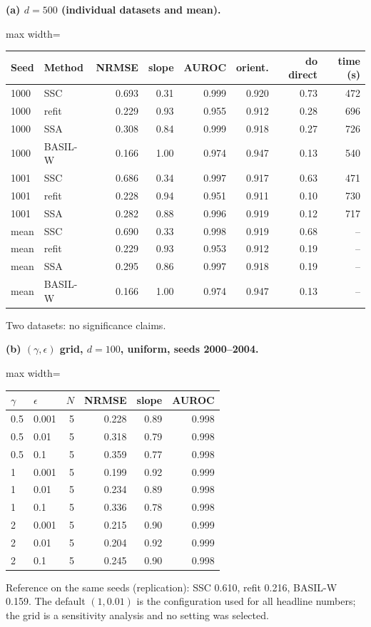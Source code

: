 \textbf{(a) $d=500$ (individual datasets and mean).}

\begin{adjustbox}{max width=\textwidth}
\begin{tabular}{llrrrrrr}
\toprule
Seed & Method & NRMSE & slope & AUROC & orient. & do direct & time (s) \\
\midrule
1000 & SSC & 0.693 & 0.31 & 0.999 & 0.920 & 0.73 & 472 \\
1000 & refit & 0.229 & 0.93 & 0.955 & 0.912 & 0.28 & 696 \\
1000 & SSA & 0.308 & 0.84 & 0.999 & 0.918 & 0.27 & 726 \\
1000 & BASIL-W & 0.166 & 1.00 & 0.974 & 0.947 & 0.13 & 540 \\
1001 & SSC & 0.686 & 0.34 & 0.997 & 0.917 & 0.63 & 471 \\
1001 & refit & 0.228 & 0.94 & 0.951 & 0.911 & 0.10 & 730 \\
1001 & SSA & 0.282 & 0.88 & 0.996 & 0.919 & 0.12 & 717 \\
mean & SSC & 0.690 & 0.33 & 0.998 & 0.919 & 0.68 & -- \\
mean & refit & 0.229 & 0.93 & 0.953 & 0.912 & 0.19 & -- \\
mean & SSA & 0.295 & 0.86 & 0.997 & 0.918 & 0.19 & -- \\
mean & BASIL-W & 0.166 & 1.00 & 0.974 & 0.947 & 0.13 & -- \\
\bottomrule
\end{tabular}
\end{adjustbox}

\smallskip
{\footnotesize Two datasets: no significance claims.}

\bigskip
\textbf{(b) $(\gamma,\epsilon)$ grid, $d=100$, uniform, seeds 2000--2004.}

\begin{adjustbox}{max width=\textwidth}
\begin{tabular}{llrrrr}
\toprule
$\gamma$ & $\epsilon$ & $N$ & NRMSE & slope & AUROC \\
\midrule
0.5 & 0.001 & 5 & 0.228 & 0.89 & 0.998 \\
0.5 & 0.01 & 5 & 0.318 & 0.79 & 0.998 \\
0.5 & 0.1 & 5 & 0.359 & 0.77 & 0.998 \\
1 & 0.001 & 5 & 0.199 & 0.92 & 0.999 \\
1 & 0.01 & 5 & 0.234 & 0.89 & 0.998 \\
1 & 0.1 & 5 & 0.336 & 0.78 & 0.998 \\
2 & 0.001 & 5 & 0.215 & 0.90 & 0.999 \\
2 & 0.01 & 5 & 0.204 & 0.92 & 0.999 \\
2 & 0.1 & 5 & 0.245 & 0.90 & 0.998 \\
\bottomrule
\end{tabular}
\end{adjustbox}

\smallskip
{\footnotesize Reference on the same seeds (replication): SSC 0.610, refit 0.216, BASIL-W 0.159. The default $(1,0.01)$ is the configuration used for all headline numbers; the grid is a sensitivity analysis and no setting was selected.}
